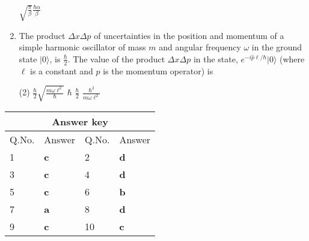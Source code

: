 \begin{enumerate}
\begin{tasks}
	\task[\textbf{D.}]$\sqrt{\frac{\pi}{\beta}} \frac{\hbar \alpha}{\beta}$
\end{tasks}
	\item The product $\Delta x \Delta p$ of uncertainties in the position and momentum of a simple harmonic oscillator of mass $m$ and angular frequency $\omega$ in the ground state $|0\rangle$, is $\frac{\hbar}{2}$. The value of the product $\Delta x \Delta p$ in the state, $e^{-i \hat{p} \ell / \hbar}|0\rangle$ (where $\ell$ is a constant and $\hat{p}$ is the momentum operator) is
{	}
\begin{tasks}(2)
	\task[\textbf{A.}] $\frac{\hbar}{2} \sqrt{\frac{m \omega \ell^{2}}{\hbar}}$
	\task[\textbf{B.}]$\hbar$
	\task[\textbf{C.}] $\frac{\hbar}{2}$
	\task[\textbf{D.}] $\frac{\hbar^{2}}{m \omega \ell^{2}}$
\end{tasks}
\end{enumerate}
\setlength\arrayrulewidth{1pt}
\begin{table}[H]
	\centering
	
	\begin{tabular}{|p{1.5cm}|p{1.5cm}||p{1.5cm}|p{1.5cm}|}
		\hline
		\multicolumn{4}{|c|}{\textbf{Answer key}}\\\hline\hline
		\rowcolor{ocrel}Q.No.&Answer&Q.No.&Answer\\\hline
		1&\textbf{c}&2&\textbf{d}\\\hline
		3&\textbf{c}&4&\textbf{d}\\\hline
		5&\textbf{c}&6&\textbf{b}\\\hline
		7&\textbf{a}&8&\textbf{d}\\\hline
		9&\textbf{c}&10&\textbf{c}\\\hline
	\end{tabular}
\end{table}


